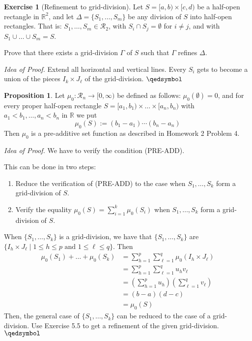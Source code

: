 \documentclass[11pt]{article}
\theoremstyle{definition}
\newtheorem{prop}[thm]{Proposition}
\newtheorem{exercise}[thm]{Exercise}
\newcommand{\R}{\ensuremath{\mathbb{R}}}
\begin{document}
\begin{exercise}[Refinement to grid-division]
Let $S = [a, b) \times [c, d)$ be a half-open rectangle in $\R^2$, and let $\Delta = \{S_1, \dots, S_m\}$ be any division of $S$ into half-open rectangles. That is: $S_1, \dots, S_m \in \mathcal{R}_2$, with $S_i \cap S_j = \emptyset$ for $i \ne j$, and with $S_1 \cup \dots \cup S_m = S$.

Prove that there exists a grid-division $\Gamma$ of $S$ such that $\Gamma$ refines $\Delta$. 

\emph{Idea of Proof.} Extend all horizontal and vertical lines. Every $S_i$ gets to become a union of the pieces $I_k \times J_\ell$ of the grid-division. \hfill $\qedsymbol$
\end{exercise}

\begin{prop}
Let $\mu_0 : \mathcal{R}_n \to [0, \infty)$ be defined as follows: $\mu_0 (\emptyset) = 0$, and for every proper half-open rectangle $S = [a_1, b_1) \times \dots \times [a_n, b_n)$ with $a_1 < b_1, \dots, a_n < b_n$ in $\R$ we put
$$\mu_0 (S) := (b_1 - a_1) \cdots (b_n - a_n)$$
Then $\mu_0$ is a pre-additive set function as described in Homework 2 Problem 4.
\end{prop}
\emph{Idea of Proof.} We have to verify the condition (PRE-ADD). 

This can be done in two steps: \vspace{-1.5ex}
\begin{enumerate}[(1)]
\item Reduce the verification of (PRE-ADD) to the case when $S_1, \dots, S_k$ form a grid-division of $S$.
\item Verify the equality $\mu_0 (S) = \sum_{i=1}^k \mu_0 (S_i)$ when $S_1, \dots, S_k$ form a grid-division of $S$.
\end{enumerate}
\vspace{-1.5ex}
When $\{S_1, \dots, S_k\}$ is a grid-division, we have that $\{S_1, \dots, S_k\}$ are $\{I_h \times J_\ell \mid 1 \leq h \leq p \text{ and } 1 \leq \ell \leq q\}$. Then
\begin{align*}
    \mu_0(S_1) + \dots + \mu_0(S_k)
    &= \sum_{h=1}^p \sum_{\ell=1}^q \mu_0 (I_h \times J_\ell) \\
    &= \sum_{h=1}^p \sum_{\ell=1}^q u_h v_\ell \\
    &= \left( \sum_{h=1}^p u_h \right) \left( \sum_{\ell=1}^q v_\ell \right) \\
    &= (b-a)(d-c) \\
    &= \mu_0 (S)
\end{align*}
Then, the general case of $\{S_1, \dots, S_k\}$ can be reduced to the case of a grid-division. Use Exercise 5.5 to get a refinement of the given grid-division. \hfill $\qedsymbol$
\end{document}
